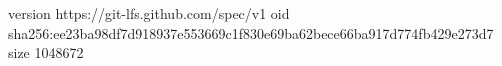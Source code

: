version https://git-lfs.github.com/spec/v1
oid sha256:ee23ba98df7d918937e553669c1f830e69ba62bece66ba917d774fb429e273d7
size 1048672
